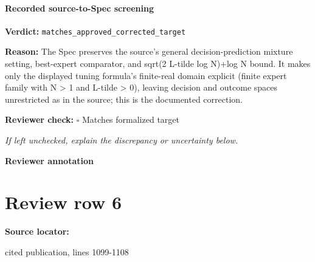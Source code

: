 \documentclass[10pt]{article}
\newcommand{\reviewerbox}{%
  \par\noindent\fbox{\parbox{0.96\linewidth}{\rule{0pt}{0.38in}}}\par
}
\newcommand{\reviewmatch}[1]{%
  \par\noindent\textbf{Reviewer check:} $\square$\; #1\par
  \noindent\emph{If left unchecked, explain the discrepancy or uncertainty below.}\par
}
\begin{document}
\paragraph{Recorded source-to-Spec screening}
\textbf{Verdict:} \texttt{matches\_approved\_corrected\_target}
\\
{\raggedright
\textbf{Reason:} The Spec preserves the source's general decision-\allowbreak{}prediction mixture setting, best-\allowbreak{}expert comparator, and sqrt(2 L-\allowbreak{}tilde log N)+log N bound.\allowbreak{} It makes only the displayed tuning formula's finite-\allowbreak{}real domain explicit (finite expert family with N > 1 and L-\allowbreak{}tilde > 0), leaving decision and outcome spaces unrestricted as in the source;\allowbreak{} this is the documented correction.\allowbreak{}
\par}
\reviewmatch{Matches formalized target}
\noindent\textbf{Reviewer annotation}\par
\reviewerbox
\clearpage
\hypertarget{source-claim-4636471b1f8c8e3c}{}
\section*{Review row 6}
\textbf{Source locator:} {\footnotesize\raggedright cited publication, lines 1099-\allowbreak{}1108\par}
\end{document}

